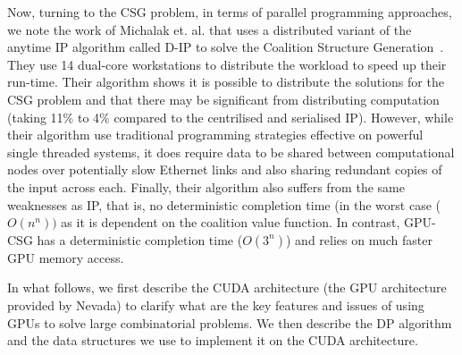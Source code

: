 \documentclass{llncs}
\begin{document}
Now, turning to the CSG problem, in terms of parallel programming approaches, we note the work of Michalak et. al. that uses a distributed variant of the anytime IP algorithm called D-IP to solve the Coalition Structure Generation~\cite{michalak2010distributed}. They use 14 dual-core workstations to distribute the workload to speed up their run-time. Their algorithm  shows it is possible to distribute the solutions for the CSG problem and that there may be significant from distributing computation (taking 11\% to 4\%  compared to the centrilised and serialised IP). However, while their algorithm use traditional programming strategies effective on powerful single threaded systems, it does require data to be shared between computational nodes over potentially slow Ethernet links and also sharing redundant copies of the input across each. Finally, their algorithm also suffers from the same weaknesses as IP, that is, no deterministic completion time (in the worst case ($O(n^n))$ as it is dependent on the coalition value function. In contrast, GPU-CSG has a deterministic completion time ($O(3^n)$) and relies on much faster GPU memory access.

In what follows, we first describe the CUDA architecture (the GPU architecture provided by Nevada) to clarify what are the key features and issues of using GPUs to solve large combinatorial problems. We then describe the DP algorithm and the data structures we use to implement it on the CUDA architecture.
\end{document}
